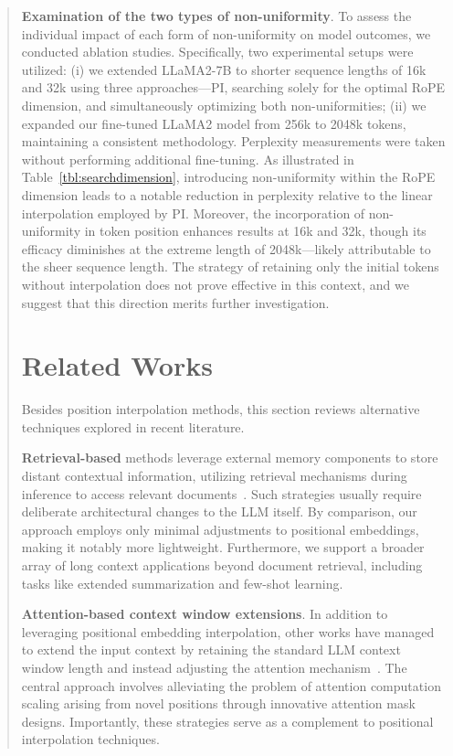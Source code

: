 \begin{abstract}
\textbf{Examination of the two types of non-uniformity}. To assess the individual impact of each form of non-uniformity on model outcomes, we conducted ablation studies. Specifically, two experimental setups were utilized: (i) we extended LLaMA2-7B to shorter sequence lengths of 16k and 32k using three approaches—PI, searching solely for the optimal RoPE dimension, and simultaneously optimizing both non-uniformities; (ii) we expanded our fine-tuned LLaMA2 model from 256k to 2048k tokens, maintaining a consistent methodology. Perplexity measurements were taken without performing additional fine-tuning. As illustrated in Table~\ref{tbl:searchdimension}, introducing non-uniformity within the RoPE dimension leads to a notable reduction in perplexity relative to the linear interpolation employed by PI. Moreover, the incorporation of non-uniformity in token position enhances results at 16k and 32k, though its efficacy diminishes at the extreme length of 2048k—likely attributable to the sheer sequence length. The strategy of retaining only the initial tokens without interpolation does not prove effective in this context, and we suggest that this direction merits further investigation.

\section{Related Works}

Besides position interpolation methods, this section reviews alternative techniques explored in recent literature.

\textbf{Retrieval-based} methods leverage external memory components to store distant contextual information, utilizing retrieval mechanisms during inference to access relevant documents~\cite{longllama,wang2023augmenting,borgeaud2022improving}. Such strategies usually require deliberate architectural changes to the LLM itself. By comparison, our approach employs only minimal adjustments to positional embeddings, making it notably more lightweight. Furthermore, we support a broader array of long context applications beyond document retrieval, including tasks like extended summarization and few-shot learning.

\textbf{Attention-based context window extensions}. In addition to leveraging positional embedding interpolation, other works have managed to extend the input context by retaining the standard LLM context window length and instead adjusting the attention mechanism~\cite{han2023lminfinite, streamingllm,parallelwindow}. The central approach involves alleviating the problem of attention computation scaling arising from novel positions through innovative attention mask designs. Importantly, these strategies serve as a complement to positional interpolation techniques.


\end{abstract}

